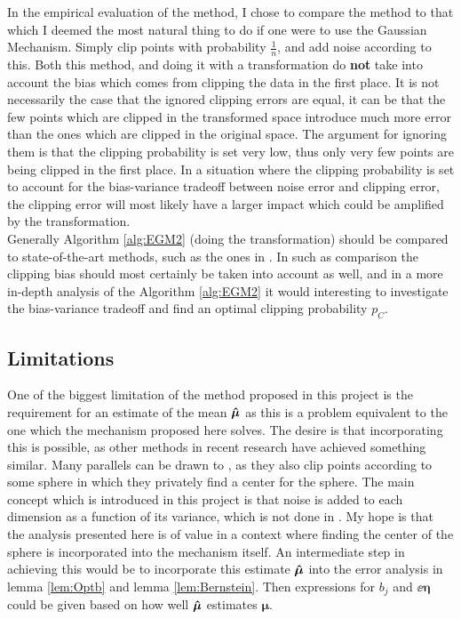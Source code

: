 \documentclass[a4paper,12pt]{article}
\begin{document}
In the empirical evaluation of the method, I chose to compare the method
to that which I deemed the most natural thing to do if 
one were to use the Gaussian Mechanism. Simply clip points with 
probability $\frac{1}{n}$, and add noise according to this.
Both this method, and doing it with a transformation do \textbf{not} take into account
the bias which comes from clipping the data in the first place. 
It is not necessarily the case that the ignored clipping errors are equal, 
it can be that the few points which are clipped in the transformed space introduce much more error
than the ones which are clipped in the original space. 
The argument for ignoring them is that the clipping probability is set very low,
thus only very few points are being clipped in the first place. In a situation where
the clipping probability is set to account for the bias-variance tradeoff between noise error
and clipping error, the clipping error will most likely have a larger impact which could be amplified by the transformation. \\
Generally Algorithm \ref{alg:EGM2} (doing the transformation) should
be compared to state-of-the-art methods, such as the ones in \cite{coinpress, Huang2021}.
In such as comparison the clipping bias should most certainly be taken into account as well, and
in a more in-depth analysis of the Algorithm \ref{alg:EGM2} it
would interesting to investigate the bias-variance tradeoff and find an
optimal clipping probability $p_{C}$.


\subsection{Limitations}
One of the biggest limitation of the method proposed in this project is the requirement for an estimate
of the mean $\bm{\hat{\mu}}$ as this is a problem equivalent to the one which the mechanism proposed here solves.
The desire is that incorporating this is possible, as other methods in recent research have achieved something similar.
Many parallels can be drawn to \cite{Huang2021}, as they also clip points
according to some sphere in which they privately find a center for the sphere. The main concept which is introduced in this project
is that noise is added to each dimension as a function of its variance, which is not done in \cite{Huang2021}.
My hope is that the analysis presented here is of value in a context where finding the center of the sphere is incorporated
into the mechanism itself. 
An intermediate step in achieving this would be to incorporate this estimate $\bm{\hat{\mu}}$ into the error analysis in lemma \ref{lem:Optb} 
and lemma \ref{lem:Bernstein}. Then expressions for $b_j$ and $\ee{\bm{\eta}}$ could be given based on how well $\bm{\hat{\mu}}$ estimates $\bm{\mu}$.
\end{document}

